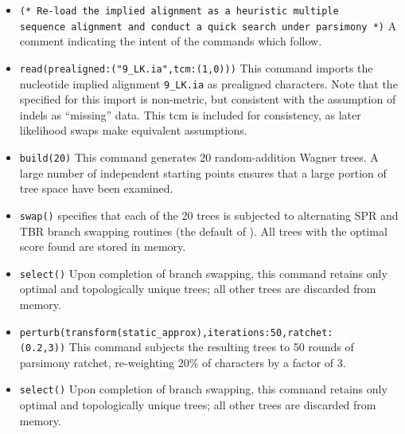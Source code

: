 \begin{itemize}
\item \texttt{(* Re-load the implied alignment as a heuristic multiple \\
   sequence alignment and conduct a quick search under parsimony *)} A comment indicating the intent of the commands 
which follow.
\item \texttt{read(prealigned:("9\_LK.ia",tcm:(1,0)))} This command imports the nucleotide implied 
alignment \texttt{9\_LK.ia} as prealigned characters. Note that the  specified for this import 
is non-metric, but consistent with the assumption of indels as ``missing'' data. This tcm is included for consistency, 
as later likelihood swaps make equivalent assumptions.
\item \texttt{build(20)} This command generates 20 random-addition Wagner trees. A large number of 
independent starting points ensures that a large portion of tree space have been examined.
\item \texttt{swap()}  specifies that each of the 20 trees is subjected to alternating SPR and 
TBR branch swapping routines (the default of \poy). All trees with the optimal score found are stored in memory.
\item \texttt{select()} Upon completion of branch swapping, this command retains only optimal and topologically 
unique trees; all other trees are discarded from memory. 
\item \texttt{perturb(transform(static\_approx),iterations:50,ratchet:\\(0.2,3))} This command subjects the resulting 
trees to 50 rounds of parsimony ratchet, re-weighting 20\% of characters by a factor of 3.
\item \texttt{select()} Upon completion of branch swapping, this command retains only optimal and topologically 
unique trees; all other trees are discarded from memory. 


\end{itemize}
